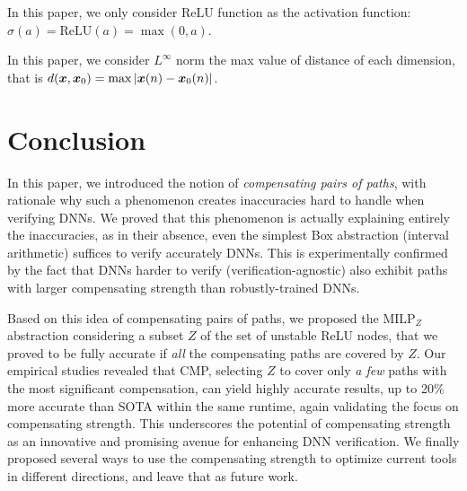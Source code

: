 \documentclass{article} %
\newcommand{\MILP}{{\textrm{MILP}}}
\theoremstyle{definition}
\newcommand{\ReLU}{\mathrm{ReLU}}
\begin{document}
In this paper, we only consider $\ReLU$ function as the activation function: $\sigma(a)=\ReLU(a)=\max(0,a)$. 

In this paper, we consider $L^{\infty}$ norm the max value of distance of each dimension, that is $d({\bm{x}},\boldsymbol{x}_0)=\max |\boldsymbol{x}(n)-\boldsymbol{x}_0(n)|$. 
\fi











\section{Conclusion}

In this paper, we introduced the notion of {\em compensating pairs of paths}, with rationale why such a phenomenon creates inaccuracies hard to handle when verifying DNNs. We proved that this phenomenon is actually explaining entirely the inaccuracies, as in their absence, even the simplest Box abstraction (interval arithmetic) suffices to verify accurately DNNs. This is experimentally confirmed by the fact that DNNs harder to verify (verification-agnostic) also exhibit paths with larger compensating strength than  robustly-trained DNNs.

Based on this idea of compensating pairs of paths, we proposed the $\MILP_{Z}$ abstraction considering a subset $Z$ of the set of unstable ReLU nodes, that we proved to be fully accurate if {\em all} the compensating paths are covered by $Z$. Our empirical studies revealed that CMP, selecting $Z$ to cover only {\em a few} paths with the most significant compensation, can yield highly accurate results, up to 20\% more accurate than SOTA within the same runtime, again validating the focus on compensating strength. 
This underscores the potential of compensating strength as an innovative and promising avenue for enhancing DNN verification. We finally proposed several ways to use the compensating strength to optimize current tools in different directions, and leave that as future work.
\newpage




\newpage

\appendix


\end{document}
